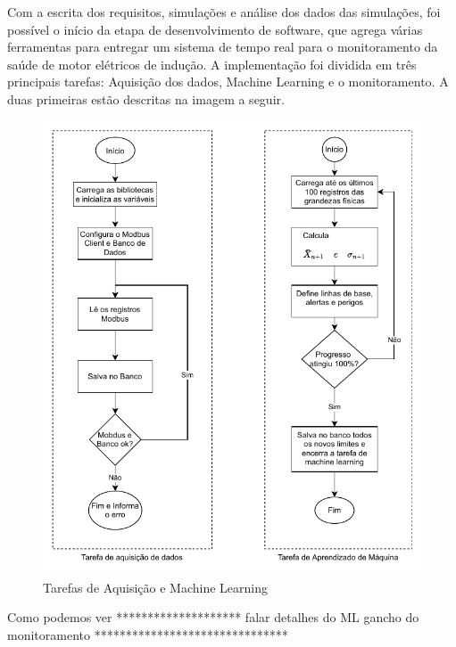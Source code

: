 Com a escrita dos requisitos, simulações e análise dos dados das simulações, foi possível o início da etapa de desenvolvimento de software,
que agrega várias ferramentas para entregar um sistema de tempo real para o monitoramento da saúde de motor elétricos de indução. A 
implementação foi dividida em três principais tarefas: Aquisição dos dados, Machine Learning e o monitoramento. A duas primeiras estão
descritas na imagem a seguir.

\begin{figure}[H]
    \caption{Tarefas de Aquisição e Machine Learning}
    \begin{center}
        \includegraphics[scale=1, page=1]{metodologia/img/software.pdf}
    \end{center}
    \label{fig:tarefa_aq_ml}
\end{figure}

Como podemos ver ******************** falar detalhes do ML
gancho do monitoramento *******************************

